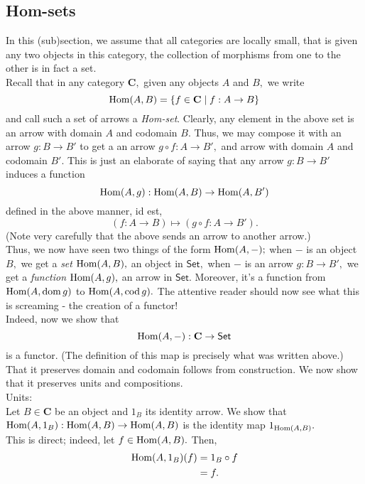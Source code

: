 \subsection{Hom-sets}
In this (sub)section, we assume that all categories are locally small, that is given any two objects in this category, the collection of morphisms from one to the other is in fact a set.\\
Recall that in any category $\mathbf{C},$ given any objects $A$ and $B,$ we write
\begin{equation*} 
	\operatorname{Hom}(A, B) = \{f \in \mathbf{C} \mid f:A\to B\}
\end{equation*}
and call such a set of arrows a \emph{Hom-set}. Clearly, any element in the above set is an arrow with domain $A$ and codomain $B.$ Thus, we may compose it with an arrow $g : B \to B'$ to get a an arrow $g\circ f:A \to B',$ and arrow with domain $A$ and codomain $B'.$ This is just an elaborate of saying that any arrow $g:B\to B'$ induces a function
\begin{equation*} 
	\operatorname{Hom}(A, g) : \operatorname{Hom}(A, B) \to \operatorname{Hom}(A, B')
\end{equation*}
defined in the above manner, id est,
\begin{equation*} 
	(f: A \to B) \mapsto (g \circ f:A \to B').
\end{equation*}
(Note very carefully that the above sends an arrow to another arrow.)\\
Thus, we now have seen two things of the form $\operatorname{Hom}(A, -);$ when $-$ is an object $B,$ we get a \emph{set} $\operatorname{Hom}(A, B),$ an object in $\mathsf{Set},$ when $-$ is an arrow $g:B\to B',$ we get a \emph{function} $\operatorname{Hom}(A, g),$ an arrow in $\mathsf{Set}.$ Moreover, it's a function from $\operatorname{Hom}(A, \operatorname{dom} g)$ to $\operatorname{Hom}(A, \operatorname{cod} g).$ The attentive reader should now see what this is screaming - the creation of a functor!\\
Indeed, now we show that
\begin{equation*} 
	\operatorname{Hom}(A, -) : \mathbf{C} \to \mathsf{Set}
\end{equation*}
is a functor. (The definition of this map is precisely what was written above.)\\
That it preserves domain and codomain follows from construction. We now show that it preserves units and compositions.\\
Units:\\
Let $B \in \mathbf{C}$ be an object and $1_B$ its identity arrow. We show that $\operatorname{Hom}(A, 1_B):\operatorname{Hom}(A, B) \to \operatorname{Hom}(A, B)$ is the identity map $1_{\operatorname{Hom}(A, B)}.$\\
This is direct; indeed, let $f \in \operatorname{Hom}(A, B).$ Then,
\begin{align*} 
	\operatorname{Hom}(A, 1_B)(f) &= 1_B \circ f\\
	&= f.
\end{align*}

